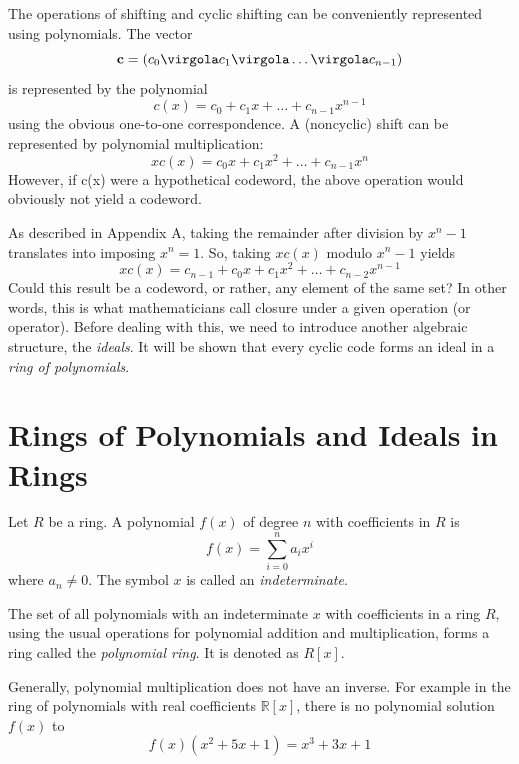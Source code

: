 The operations of shifting and cyclic shifting can be conveniently represented using polynomials. The vector
\begin{equation}
 \vet{c}=(c_0 \virgola c_1 \virgola \ldots \virgola c_{n-1})
\end{equation}
is represented by the polynomial
\begin{equation}
c(x) = c_0 + c_1x+\ldots+c_{n-1}x^{n-1}
\end{equation}
using the obvious one-to-one correspondence.
A (noncyclic) shift can be represented by polynomial multiplication:
\begin{equation}
xc(x)= c_0x + c_1x^2+\ldots+c_{n-1}x^{n}
\end{equation}
However, if c(x) were a hypothetical codeword, the above operation would obviously not yield a codeword.

As described in Appendix A, taking the remainder after division by \(x^n-1\) translates into imposing \(x^n=1\). So, taking \(xc(x) \) modulo \(x^n-1\) yields
\begin{equation}
xc(x)=c_{n-1} + c_0x + c_1x^2+\ldots+ c_{n-2}x^{n-1}
\end{equation}
Could this result be a codeword, or rather, any element of the same set? In other words, this is what mathematicians call closure under a given operation (or operator).
Before dealing with this, we need to introduce another algebraic structure, the \emph{ideals}. It will be shown that every cyclic code forms an ideal in a \emph{ring of polynomials}.



\section{Rings of Polynomials and Ideals in Rings} \label{sec:ideals}

Let $R$ be a ring. A polynomial \( f(x) \) of degree $n$ with coefficients in $R$ is
\begin{equation}
f(x) = \sum^{n}_{i=0}{a_ix^i}
\end{equation}
where \( a_n \neq 0 \). The symbol $x$ is called an \emph{indeterminate}.

\begin{Def}
The set of all polynomials with an indeterminate $x$ with coefficients in a ring $R$, using the usual operations for polynomial addition and multiplication, forms a ring called the \emph{polynomial ring}. It is denoted as $R[x]$.
\end{Def}
Generally, polynomial multiplication does not have an inverse. For example in the ring of polynomials with real coefficients $\mathbb R [x]$, there is no polynomial solution $f(x)$ to
\[
f(x)(x^2+5x+1) = x^3+3x+1
\]

